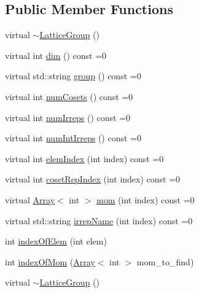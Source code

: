 \subsection*{Public Member Functions}
\begin{DoxyCompactItemize}
\item 
virtual \mbox{\hyperlink{structHadron_1_1LatticeGroup_a8265941ad6e64b658d2eb904e7d85d62}{$\sim$\+Lattice\+Group}} ()
\item 
virtual int \mbox{\hyperlink{structHadron_1_1LatticeGroup_abd8415698323796ef6a8605796ee3bea}{dim}} () const =0
\item 
virtual std\+::string \mbox{\hyperlink{structHadron_1_1LatticeGroup_a82208a322bf1b1db489f16af38e70087}{group}} () const =0
\item 
virtual int \mbox{\hyperlink{structHadron_1_1LatticeGroup_afc76430f36a3a041f86d4058c59bf55e}{num\+Cosets}} () const =0
\item 
virtual int \mbox{\hyperlink{structHadron_1_1LatticeGroup_a3edaca488144b5d2a9cf73fe653add34}{num\+Irreps}} () const =0
\item 
virtual int \mbox{\hyperlink{structHadron_1_1LatticeGroup_af2aa7b39222bf188389356eefcef7547}{num\+Int\+Irreps}} () const =0
\item 
virtual int \mbox{\hyperlink{structHadron_1_1LatticeGroup_afb8e3ee60de059f75bce1044c694e1e8}{elem\+Index}} (int index) const =0
\item 
virtual int \mbox{\hyperlink{structHadron_1_1LatticeGroup_a7e3b9b5e2f596e6c40d64aa939a3ad6c}{coset\+Rep\+Index}} (int index) const =0
\item 
virtual \mbox{\hyperlink{classXMLArray_1_1Array}{Array}}$<$ int $>$ \mbox{\hyperlink{structHadron_1_1LatticeGroup_ad577b65041dd9a6e84b1f3bd49cb8fce}{mom}} (int index) const =0
\item 
virtual std\+::string \mbox{\hyperlink{structHadron_1_1LatticeGroup_a4bc5620218c2a73157e19bc4451fe746}{irrep\+Name}} (int index) const =0
\item 
int \mbox{\hyperlink{structHadron_1_1LatticeGroup_a4a664d3cbcc8a3b1634e4eb8434f1199}{index\+Of\+Elem}} (int elem)
\item 
int \mbox{\hyperlink{structHadron_1_1LatticeGroup_a49927e4a4d386b2e3eed6f3b5c1ee76d}{index\+Of\+Mom}} (\mbox{\hyperlink{classXMLArray_1_1Array}{Array}}$<$ int $>$ mom\+\_\+to\+\_\+find)
\item 
virtual \mbox{\hyperlink{structHadron_1_1LatticeGroup_a8265941ad6e64b658d2eb904e7d85d62}{$\sim$\+Lattice\+Group}} ()
\item 

\end{DoxyCompactItemize}
